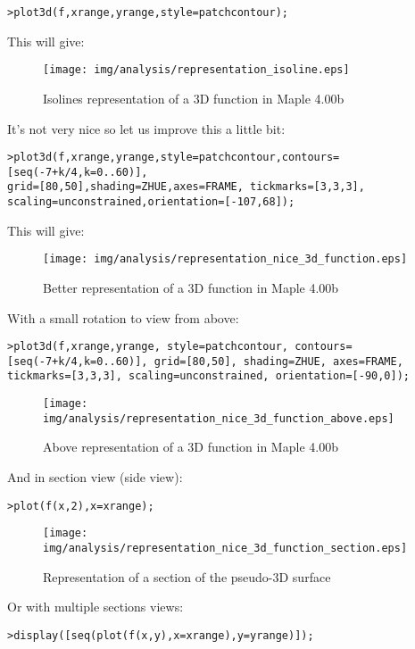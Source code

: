 	\texttt{>plot3d(f,xrange,yrange,style=patchcontour);}

	This will give:

	\begin{figure}[H]
		\centering
		\texttt{[image: img/analysis/representation\_isoline.eps]}
		\vspace*{3mm}
		\caption{Isolines representation of a 3D function in Maple 4.00b}
	\end{figure}
	
	It's not very nice so let us improve this a little bit:
	
	\texttt{>plot3d(f,xrange,yrange,style=patchcontour,contours=[seq(-7+k/4,k=0..60)],\\
	grid=[80,50],shading=ZHUE,axes=FRAME, tickmarks=[3,3,3],\\ scaling=unconstrained,orientation=[-107,68]);}
	
	This will give:
	
	\begin{figure}[H]
		\centering
		\texttt{[image: img/analysis/representation\_nice\_3d\_function.eps]}
		\vspace*{3mm}
		\caption{Better representation of a 3D function in Maple 4.00b}
	\end{figure}

	With a small rotation to view from above:

	\texttt{>plot3d(f,xrange,yrange, style=patchcontour, contours=[seq(-7+k/4,k=0..60)], grid=[80,50], shading=ZHUE, axes=FRAME, tickmarks=[3,3,3], scaling=unconstrained, orientation=[-90,0]);}

	\begin{figure}[H]
	\centering
	\texttt{[image: img/analysis/representation\_nice\_3d\_function\_above.eps]}
	\caption[]{Above representation of a 3D function in Maple 4.00b}
	\end{figure}
	
	And in section view (side view):
	
	\texttt{>plot(f(x,2),x=xrange);}
	
	\begin{figure}[H]
	\centering
	\texttt{[image: img/analysis/representation\_nice\_3d\_function\_section.eps]}
	\vspace*{3mm}
	\caption{Representation of a section of the pseudo-3D surface}
	\end{figure}
	
	Or with multiple sections views:
	
	\texttt{>display([seq(plot(f(x,y),x=xrange),y=yrange)]);}
	

